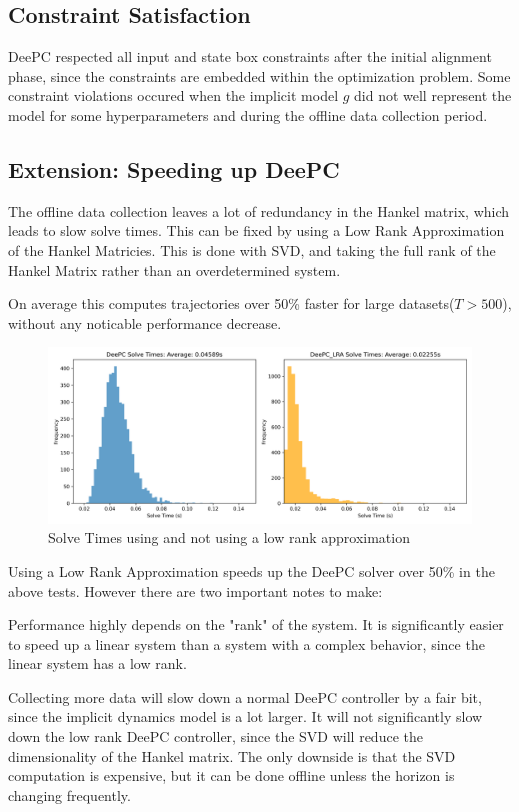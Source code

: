 \documentclass[11pt,a4paper]{article}
\begin{document}
\subsection{Constraint Satisfaction}
DeePC respected all input and state box constraints after the initial alignment phase, since the constraints are embedded within the optimization problem. Some constraint violations occured when the implicit model \(g\) did not well represent the model for some hyperparameters and during the offline data collection period.

\subsection{Extension: Speeding up DeePC}
The offline data collection leaves a lot of redundancy in the Hankel matrix, which leads to slow solve times. This can be fixed by using a Low Rank Approximation of the Hankel Matricies. This is done with SVD, and taking the full rank of the Hankel Matrix rather than an overdetermined system.

On average this computes trajectories over 50\% faster for large datasets($T>500$), without any noticable performance decrease.

\begin{figure}
    \centering
    \includegraphics[width=0.85\linewidth]{./figures/deePC_solve_times.png}
    \caption{Solve Times using and not using a low rank approximation}
    \label{fig:enter-label}
\end{figure}

Using a Low Rank Approximation speeds up the DeePC solver over 50\% in the above tests. However there are two important notes to make:

Performance highly depends on the "rank" of the system. It is significantly easier to speed up a linear system than a system with a complex behavior, since the linear system has a low rank.

Collecting more data will slow down a normal DeePC controller by a fair bit, since the implicit dynamics model is a lot larger. It will not significantly slow down the low rank DeePC controller, since the SVD will reduce the dimensionality of the Hankel matrix. The only downside is that the SVD computation is expensive, but it can be done offline unless the horizon is changing frequently.
\end{document}
